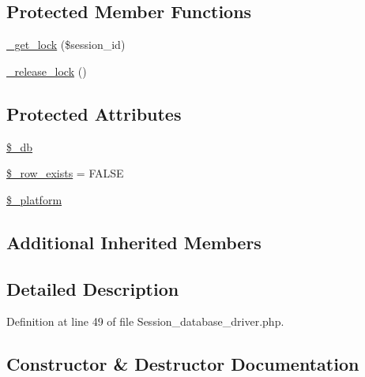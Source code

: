 \subsection*{Protected Member Functions}
\begin{DoxyCompactItemize}
\item 
\mbox{\hyperlink{class_c_i___session__database__driver_a2c49c8e23be3e2aca96a9d20de18ffc2}{\+\_\+get\+\_\+lock}} (\$session\+\_\+id)
\item 
\mbox{\hyperlink{class_c_i___session__database__driver_a0265e356e6cf1eaba229663c1664c37d}{\+\_\+release\+\_\+lock}} ()
\end{DoxyCompactItemize}
\subsection*{Protected Attributes}
\begin{DoxyCompactItemize}
\item 
\mbox{\hyperlink{class_c_i___session__database__driver_abc686c23af6ae116b72bc6adb4482a1f}{\$\+\_\+db}}
\item 
\mbox{\hyperlink{class_c_i___session__database__driver_a73dea3734ad53aa2affc8eb734db5525}{\$\+\_\+row\+\_\+exists}} = F\+A\+L\+SE
\item 
\mbox{\hyperlink{class_c_i___session__database__driver_a991522cf981c79f4faf96b16a91f8a3c}{\$\+\_\+platform}}
\end{DoxyCompactItemize}
\subsection*{Additional Inherited Members}


\subsection{Detailed Description}


Definition at line 49 of file Session\+\_\+database\+\_\+driver.\+php.



\subsection{Constructor \& Destructor Documentation}
\mbox{\label{class_c_i___session__database__driver_ac1669c73d53d6f16cf5459a1e84d39c8}} 
